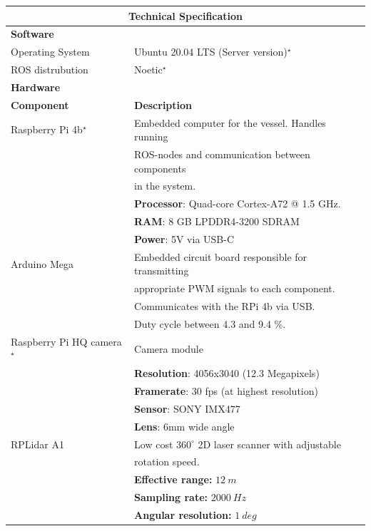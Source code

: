 \begin{table}[H]
    \centering
    \begin{tabular*}{\linewidth}{ll}
    \toprule
    \multicolumn{2}{c}{\Large \textbf{Technical Specification}} \\
    \midrule
    \multicolumn{2}{l}{\large \textbf{Software}} \\
    \midrule
    Operating System & Ubuntu 20.04 LTS (Server version)$^\star$ \\
    ROS distrubution & Noetic$^\star$ \\ 
    \midrule
    \multicolumn{2}{l}{\large \textbf{Hardware}} \\
    \midrule
    \multicolumn{1}{l}{\textbf{Component}} &  \multicolumn{1}{l}{\textbf{Description}}\\
    \hline 
    Raspberry Pi 4b$^\star$ & Embedded computer for the vessel. Handles running \\ & ROS-nodes and communication between components \\ & in the system. \\ 
    &\textbf{Processor}: Quad-core Cortex-A72 @ 1.5 GHz.\\ 
    &\textbf{RAM}: 8 GB LPDDR4-3200 SDRAM\\ 
    &\textbf{Power}: 5V via USB-C \\
    \hline 
    Arduino Mega & Embedded circuit board responsible for transmitting \\ & appropriate PWM signals to each component.  \\ & Communicates with the RPi 4b via USB. \\ & Duty cycle between 4.3 and 9.4 \%. \\
    \hline
    Raspberry Pi HQ camera$^\star$ & Camera module \\
    & \textbf{Resolution}: 4056x3040 (12.3 Megapixels) \\
    & \textbf{Framerate}: 30 fps (at highest resolution) \\
    & \textbf{Sensor}: SONY IMX477 \\
    & \textbf{Lens}: 6mm wide angle \\
    \hline
    RPLidar A1 & Low cost $360^\circ$ 2D laser scanner with adjustable \\ & rotation speed. \\ 
    & \textbf{Effective range:} $\SI{12}{m}$ \\
    & \textbf{Sampling rate:}  $\SI{2000}{Hz}$ \\
    & \textbf{Angular resolution:} $\SI{1}{deg}$ \\

\end{tabular*}
\end{table}

